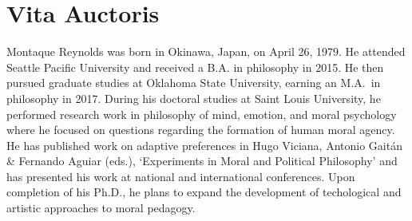 \documentclass[phdthesis,12pt,final]{wuthesis}
\theoremstyle{definition}
\theoremstyle{definition}
\theoremstyle{definition}
\theoremstyle{definition}
\theoremstyle{remark}
\begin{document}
\chapter*{Vita Auctoris}
\begin{doublespace}
Montaque Reynolds was born in Okinawa, Japan, on April 26, 1979. He attended Seattle Pacific University and received a B.A. in philosophy in 2015. He then pursued graduate studies at Oklahoma State University, earning an M.A.~in philosophy in 2017. During his doctoral studies at Saint Louis University, he performed research work in philosophy of mind, emotion, and moral psychology where he focused on questions regarding the formation of human moral agency. He has published work on adaptive preferences in Hugo Viciana, Antonio Gaitán \& Fernando Aguiar (eds.), `Experiments in Moral and Political Philosophy' and has presented his work at national and international conferences. Upon completion of his Ph.D., he plans to expand the development of techological and artistic approaches to moral pedagogy.
\end{doublespace}

\end{document}
